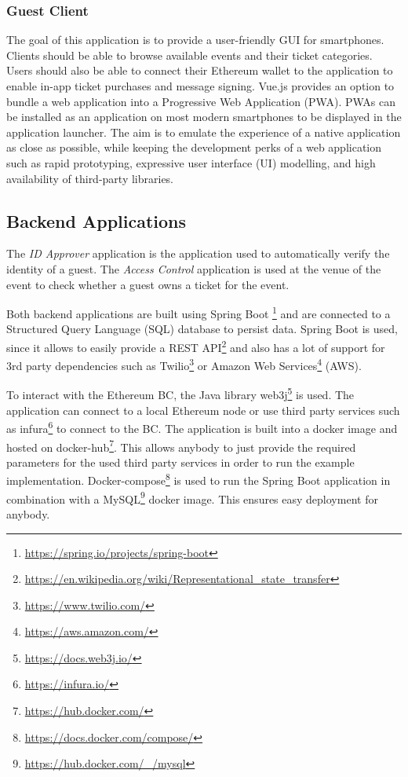 \subsubsection{Guest Client}

The goal of this application is to provide a user-friendly GUI for smartphones. Clients should be able to browse available events and their ticket categories. Users should also be able to connect their Ethereum wallet to the application to enable in-app ticket purchases and message signing. Vue.js provides an option to bundle a web application into a Progressive Web Application (PWA). PWAs can be installed as an application on most modern smartphones to be displayed in the application launcher. The aim is to emulate the experience of a native application as close as possible, while keeping the development perks of a web application such as rapid prototyping, expressive user interface (UI) modelling, and high availability of third-party libraries.

\subsection{Backend Applications}

The \textit{ID Approver} application is the application used to automatically verify the identity of a guest. The \textit{Access Control} application is used at the venue of the event to check whether a guest owns a ticket for the event.

Both backend applications are built using Spring Boot \footnote{\href{https://spring.io/projects/spring-boot}{https://spring.io/projects/spring-boot}} and are connected to a Structured Query Language (SQL) database to persist data. Spring Boot is used, since it allows to easily provide a REST API\footnote{\href{https://en.wikipedia.org/wiki/Representational_state_transfer}{https://en.wikipedia.org/wiki/Representational\_state\_transfer}} and also has a lot of support for 3rd party dependencies such as Twilio\footnote{\href{https://www.twilio.com/}{https://www.twilio.com/}} or Amazon Web Services\footnote{\href{https://aws.amazon.com/}{https://aws.amazon.com/}} (AWS).

To interact with the Ethereum BC, the Java library web3j\footnote{\href{https://docs.web3j.io/}{https://docs.web3j.io/}} is used. 
The application can connect to a local Ethereum node or use third party services such as infura\footnote{\href{https://infura.io/}{https://infura.io/}} to connect to the BC.
The application is built into a docker image and hosted on docker-hub\footnote{\href{https://hub.docker.com/}{https://hub.docker.com/}}. This allows anybody to just provide the required parameters for the used third party services in order to run the example implementation.  
Docker-compose\footnote{\href{https://docs.docker.com/compose/}{https://docs.docker.com/compose/}} is used to run the Spring Boot application in combination with a MySQL\footnote{\href{https://hub.docker.com/_/mysql}{https://hub.docker.com/\_/mysql}} docker image. This ensures easy deployment for anybody.



